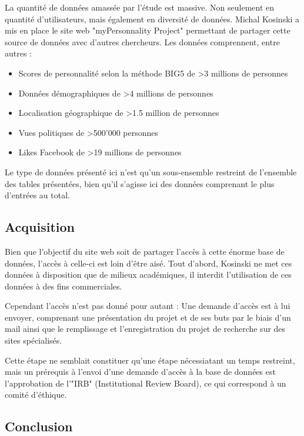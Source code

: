 		La quantité de données amassée par l'étude est massive. Non seulement en quantité d'utilisateurs, mais également en diversité de données. Michal Kosinski a mis en place le site web "myPersonnality Project"\cite{mypersonnality} permettant de partager cette source de données avec d'autres chercheurs. Les données comprennent, entre autres :

		\begin{itemize}
			\item Scores de personnalité selon la méthode BIG5 de >3 millions de personnes
			\item Données démographiques de >4 millions de personnes
			\item Localisation géographique de >1.5 million de personnes
			\item Vues politiques de >500'000 personnes
			\item Likes Facebook de >19 millions de personnes
		\end{itemize}

		Le type de données présenté ici n'est qu'un sous-ensemble restreint de l'ensemble des tables présentées, bien qu'il s'agisse ici des données comprenant le plus d'entrées au total.

	\subsection{Acquisition}

		Bien que l'objectif du site web soit de partager l'accès à cette énorme base de données, l'accès à celle-ci est loin d'être aisé. Tout d'abord, Kosinski ne met ces données à disposition que de milieux académiques, il interdit l'utilisation de ces données à des fins commerciales.

		Cependant l'accès n'est pas donné pour autant : Une demande d'accès est à lui envoyer, comprenant une présentation du projet et de ses buts par le biais d'un mail ainsi que le remplissage et l'enregistration du projet de recherche sur des sites spécialisés.

		Cette étape ne semblait constituer qu'une étape nécessiatant un temps restreint, mais un prérequis à l'envoi d'une demande d'accès à la base de données est l'approbation de l'"IRB" (Institutional Review Board), ce qui correspond à un comité d'éthique.

	\subsection{Conclusion}

